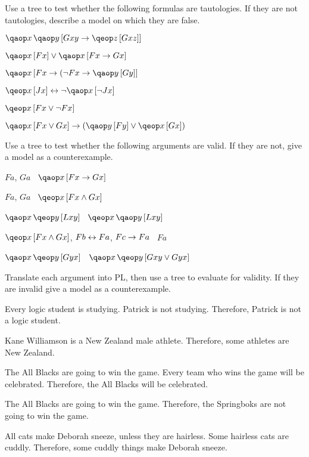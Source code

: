 \documentclass[PHIL101-Textbook.tex]{subfiles}
\begin{document}
\pagebreak
\practiceproblems

\noindent\solutions
\problempart
\label{pr.PL.trees.tautology}
Use a tree to test whether the following formulas are tautologies. If they are not tautologies, describe a model on which they are false.
\begin{earg}
\item $\qa{x}{\qab{y}{Gxy \eif \qeb{z}{Gxz}}}$
\item $\qab{x}{Fx} \eor \qab{x}{Fx \eif Gx}$
\item $\qab{x}{Fx \eif (\enot Fx \eif \qab{y}{Gy}}$
\item $\qeb{x}{Jx} \eiff \enot \qab{x}{\enot Jx}$
\item $\qeb{x}{Fx \eor \enot Fx}$
\item $\qab{x}{Fx \eor Gx} \eif (\qab{y}{Fy} \eor \qeb{x}{Gx})$
\end{earg}

\noindent\solutions
\problempart
\label{pr.PL.trees.validity}
Use a tree to test whether the following arguments are valid. If they are not, give a model as a counterexample.
\begin{earg}
\item $Fa$, $Ga$ \therefore\ $\qab{x}{Fx \eif Gx}$
\item $Fa$, $Ga$ \therefore\ $\qeb{x}{Fx \eand Gx}$
\item $\qa{x}{\qeb{y}{Lxy}}$ \therefore\ $\qe{x}{\qab{y}{Lxy}}$
\item $\qeb{x}{Fx \eand Gx}$, $Fb \leftrightarrow Fa$, $Fc \rightarrow Fa$ \therefore\ $Fa$
\item $\qa{x}{\qeb{y}{Gyx}}$ \therefore\ $\qa{x}{\qeb{y}{Gxy \eor Gyx}}$
\end{earg}

\noindent\problempart
\label{pr.PL.trees.translation.and.validity}
Translate each argument into PL, then use a tree to evaluate for validity. If they are invalid give a model as a counterexample.
\begin{earg}
\item Every logic student is studying. Patrick is not studying. Therefore, Patrick is not a logic student.
\item Kane Williamson is a New Zealand male athlete. Therefore, some athletes are New Zealand.
\item The All Blacks are going to win the game. Every team who wins the game will be celebrated. Therefore, the All Blacks will be celebrated.
\item The All Blacks are going to win the game. Therefore, the Springboks are not going to win the game.
\item All cats make Deborah sneeze, unless they are hairless. Some hairless cats are cuddly. Therefore, some cuddly things make Deborah sneeze.
\end{earg}
\end{document}
